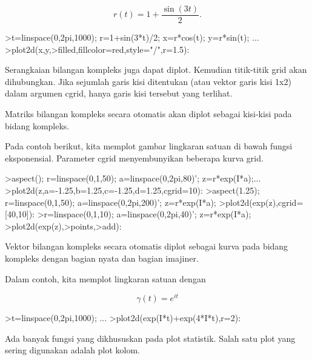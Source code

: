 \documentclass{article}
\begin{document}
\begin{eulernotebook}
\begin{eulercomment}
\begin{eulercomment}
\begin{eulercomment}
\begin{eulercomment}
\begin{eulercomment}
\begin{eulercomment}
\begin{eulercomment}
\end{eulercomment}
\begin{eulerformula}
\[
r(t) = 1 + \dfrac{\sin(3t)}{2}.
\]
\end{eulerformula}
\begin{eulerprompt}
>t=linspace(0,2pi,1000); r=1+sin(3*t)/2; x=r*cos(t); y=r*sin(t); ...
>plot2d(x,y,>filled,fillcolor=red,style="/",r=1.5):
\end{eulerprompt}
\begin{eulercomment}
Serangkaian bilangan kompleks juga dapat diplot. Kemudian titik-titik
grid akan dihubungkan. Jika sejumlah garis kisi ditentukan (atau
vektor garis kisi 1x2) dalam argumen cgrid, hanya garis kisi tersebut
yang terlihat.

Matriks bilangan kompleks secara otomatis akan diplot sebagai
kisi-kisi pada bidang kompleks.

Pada contoh berikut, kita memplot gambar lingkaran satuan di bawah
fungsi eksponensial. Parameter cgrid menyembunyikan beberapa kurva
grid.
\end{eulercomment}
\begin{eulerprompt}
>aspect(); r=linspace(0,1,50); a=linspace(0,2pi,80)'; z=r*exp(I*a);...
>plot2d(z,a=-1.25,b=1.25,c=-1.25,d=1.25,cgrid=10):
>aspect(1.25); r=linspace(0,1,50); a=linspace(0,2pi,200)'; z=r*exp(I*a);
>plot2d(exp(z),cgrid=[40,10]):
>r=linspace(0,1,10); a=linspace(0,2pi,40)'; z=r*exp(I*a);
>plot2d(exp(z),>points,>add):
\end{eulerprompt}
\begin{eulercomment}
Vektor bilangan kompleks secara otomatis diplot sebagai kurva pada
bidang kompleks dengan bagian nyata dan bagian imajiner.

Dalam contoh, kita memplot lingkaran satuan dengan

\end{eulercomment}
\begin{eulerformula}
\[
\gamma(t) = e^{it}
\]
\end{eulerformula}
\begin{eulerprompt}
>t=linspace(0,2pi,1000); ...
>plot2d(exp(I*t)+exp(4*I*t),r=2):
\end{eulerprompt}
\begin{eulercomment}
Ada banyak fungsi yang dikhususkan pada plot statistik. Salah satu
plot yang sering digunakan adalah plot kolom.


\end{eulercomment}
\end{eulercomment}
\end{eulercomment}
\end{eulercomment}
\end{eulercomment}
\end{eulercomment}
\end{eulercomment}
\end{eulernotebook}
\end{document}
